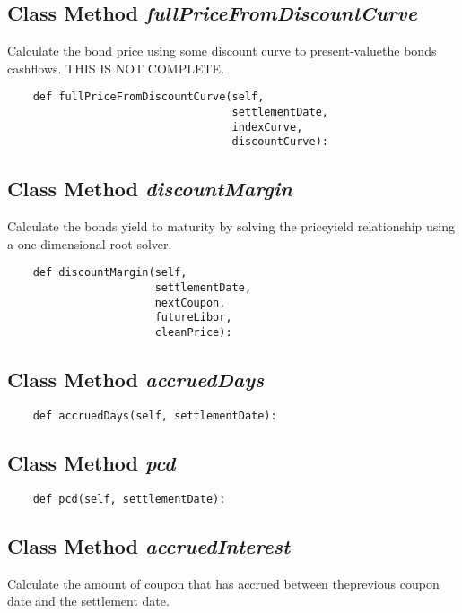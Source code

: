 \documentclass[twoside,11pt]{book}
\begin{document}
\subsection{Class Method {\it fullPriceFromDiscountCurve}}
Calculate the bond price using some discount curve to present-valuethe bonds cashflows. THIS IS NOT COMPLETE. 

\begin{lstlisting}
    def fullPriceFromDiscountCurve(self,
                                   settlementDate,
                                   indexCurve,
                                   discountCurve):
\end{lstlisting}

\subsection{Class Method {\it discountMargin}}
Calculate the bonds yield to maturity by solving the priceyield relationship using a one-dimensional root solver. 

\begin{lstlisting}
    def discountMargin(self,
                       settlementDate,
                       nextCoupon,
                       futureLibor,
                       cleanPrice):
\end{lstlisting}

\subsection{Class Method {\it accruedDays}}


\begin{lstlisting}
    def accruedDays(self, settlementDate):
\end{lstlisting}

\subsection{Class Method {\it pcd}}


\begin{lstlisting}
    def pcd(self, settlementDate):
\end{lstlisting}

\subsection{Class Method {\it accruedInterest}}
Calculate the amount of coupon that has accrued between theprevious coupon date and the settlement date. 
\end{document}

